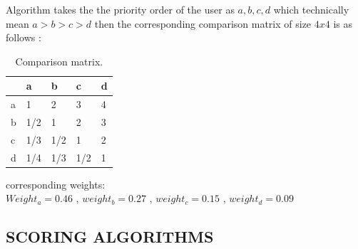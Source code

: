 \documentclass[12pt,oneside]{book}
\begin{document}
Algorithm takes the the priority order of  the user as $a , b , c , d $  which technically mean $ a > b > c > d $ then the corresponding comparison matrix of size $ 4 x 4 $ is as follows : 
\begin{table}[h!]
\centering
\caption{Comparison matrix.}
\vspace{0.1in}
 \begin{tabular}{|m{1cm}|m{1cm}|m{1cm}|m{1cm}|m{4em}|}
\hline
 & a & b & c& d\\
\hline
a& 1 & 2 & 3 & 4 \\
\hline
b & 1/2 & 1 & 2 & 3 \\
\hline
c & 1/3 & 1/2 & 1 & 2 \\
\hline
d & 1/4 & 1/3 & 1/2 & 1 \\
\hline
\end{tabular}
\end{table}
corresponding weights:\\
$Weight_a = 0.46$ , $weight_b = 0.27$ , $weight_c = 0.15$ , $weight_d = 0.09$
\subsection{SCORING ALGORITHMS}
\end{document}
